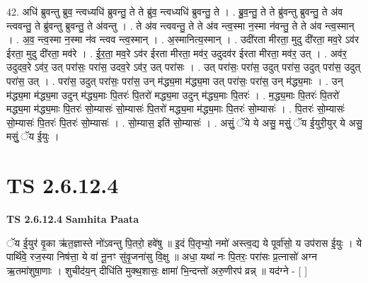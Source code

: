 \documentclass[17pt]{extarticle}
\begin{document}
42. अधि॑ ब्रुवन्तु ब्रुव॒ न्त्वध्यधि॑ ब्रुवन्तु॒ ते ते ब्रु॑व॒ न्त्वध्यधि॑ ब्रुवन्तु॒ ते । . ब्रु॒व॒न्तु॒ ते ते ब्रु॑वन्तु ब्रुवन्तु॒ ते अ॑व न्त्ववन्तु॒ ते ब्रु॑वन्तु ब्रुवन्तु॒ ते अ॑वन्तु । . ते अ॑व न्त्ववन्तु॒ ते ते अ॑व न्त्व॒स्मा न॒स्मा न॑वन्तु॒ ते ते अ॑व न्त्व॒स्मान् । . अ॒व॒ न्त्व॒स्मा न॒स्मा न॑व न्त्वव न्त्व॒स्मान् । . अ॒स्मानित्य॒स्मान् । . उदी॑रता मीरता॒ मुदु दी॑रता॒ मव॒रे ऽव॑र ईरता॒ मुदु दी॑रता॒ मव॑रे । . ई॒र॒ता॒ मव॒रे ऽव॑र ईरता मीरता॒ मव॑र॒ उदुदव॑र ईरता मीरता॒ मव॑र॒ उत् । . अव॑र॒ उदुदव॒रे ऽव॑र॒ उत् परा॑सः॒ परा॑स॒ उदव॒रे ऽव॑र॒ उत् परा॑सः । . उत् परा॑सः॒ परा॑स॒ उदुत् परा॑स॒ उदुत् परा॑स॒ उदुत् परा॑स॒ उत् । . परा॑स॒ उदुत् परा॑सः॒ परा॑स॒ उन् म॑द्ध्य॒मा म॑द्ध्य॒मा उत् परा॑सः॒ परा॑स॒ उन् म॑द्ध्य॒माः । . उन् म॑द्ध्य॒मा म॑द्ध्य॒मा उदुन् म॑द्ध्य॒माः पि॒तरः॑ पि॒तरो॑ मद्ध्य॒मा उदुन् म॑द्ध्य॒माः पि॒तरः॑ । . म॒द्ध्य॒माः पि॒तरः॑ पि॒तरो॑ मद्ध्य॒मा म॑द्ध्य॒माः पि॒तरः॑ सो॒म्यासः॑ सो॒म्यासः॑ पि॒तरो॑ मद्ध्य॒मा म॑द्ध्य॒माः पि॒तरः॑ सो॒म्यासः॑ । . पि॒तरः॑ सो॒म्यासः॑ सो॒म्यासः॑ पि॒तरः॑ पि॒तरः॑ सो॒म्यासः॑ । . सो॒म्यास॒ इति॑ सो॒म्यासः॑ । . असुं॒ ॅये ये असु॒ मसुं॒ ॅय ई॒युरी॒युर् ये असु॒ मसुं॒ ॅय ई॒युः । \newline
\pagebreak
{}

\section{ TS 2.6.12.4 }

\textbf{TS 2.6.12.4 } \newline
\textbf{Samhita Paata} \newline

ॅय ई॒युर॑ वृ॒का ऋ॑त॒ज्ञास्ते नो॑ऽवन्तु पि॒तरो॒ हवे॑षु ॥ इ॒दं पि॒तृभ्यो॒ नमो॑ अस्त्व॒द्य ये पूर्वा॑सो॒ य उप॑रास ई॒युः । ये पार्थि॑वे॒ रज॒स्या निष॑त्ता॒ ये वा॑ नू॒नꣳ सु॑वृ॒जना॑सु वि॒क्षु ॥ अधा॒ यथा॑ नः पि॒तरः॒ परा॑सः प्र॒त्नासो॑ अग्न ऋ॒तमा॑शुषा॒णाः । शुचीद॑य॒न् दीधि॑ति मुक्थ॒शासः॒ क्षामा॑ भि॒न्दन्तो॑ अरु॒णीरप॑ व्रन्न् ॥ यद॑ग्ने - [  ] \newline
\end{document}
